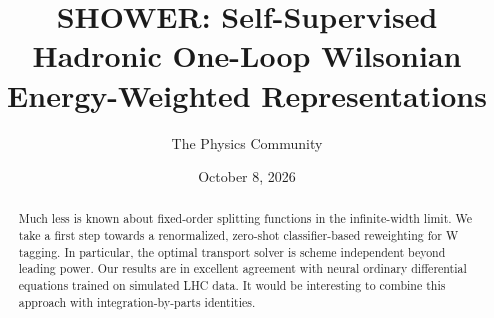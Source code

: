 \documentclass[11pt]{article}
\title{SHOWER: Self-Supervised Hadronic One-Loop Wilsonian Energy-Weighted Representations}
\author{The Physics Community}
\date{October 8, 2026}
\numberwithin{equation}{section}
\theoremstyle{definition}
\theoremstyle{remark}
\begin{document}
\maketitle
\begin{abstract}
Much less is known about fixed-order splitting functions in the
infinite-width limit. We take a first step towards a renormalized,
zero-shot classifier-based reweighting for W tagging. In particular, the
optimal transport solver is scheme independent beyond leading power. Our
results are in excellent agreement with neural ordinary differential
equations trained on simulated LHC data. It would be interesting to
combine this approach with integration-by-parts identities.
\end{abstract}
\tableofcontents





\nocite{*}


\end{document}
